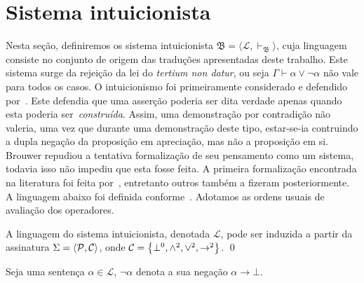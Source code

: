 \section{Sistema intuicionista}
    Nesta seção, definiremos os sistema intuicionista $\mathfrak{B}=\langle\mathcal{L},\vdash_\mathfrak{B}\rangle$, cuja linguagem consiste no conjunto de origem das traduções apresentadas deste trabalho.
    Este sistema surge da rejeição da lei do \textit{tertium non datur}, ou seja $\Gamma\vdash\alpha\vee\neg\alpha$ não vale para todos os casos.
    O intuicionismo foi primeiramente considerado e defendido por~\cite{Brouwer-A, Brouwer-B}.
    Este defendia que uma asserção poderia ser dita verdade apenas quando esta poderia ser~\emph{construída}.
    Assim, uma demonstração por contradição não valeria, uma vez que durante uma demonstração deste tipo, estar-se-ia contruindo a dupla negação da proposição em apreciação, mas não a proposição em si.
    Brouwer repudiou a tentativa formalização de seu pensamento como um sistema, todavia isso não impediu que esta fosse feita.
    A primeira formalização encontrada na literatura foi feita por~\cite{Kolmogorov}, entretanto outros também a fizeram posteriormente.
    A linguagem abaixo foi definida conforme~\cite{Troelstra}. Adotamos as ordens usuais de avaliação dos operadores.

    \vspace{\baselineskip}
    \begin{tcolorbox}[enhanced jigsaw, breakable, sharp corners, colframe=black, colback=white, boxrule=0.5pt, left=1.5mm, right=1.5mm, top=1.5mm, bottom=1.5mm]
    \begin{definition}[$\mathcal{L}$]\label{intuitionistic.language}
        A linguagem do sistema intuicionista, denotada $\mathcal{L}$, pode ser induzida a partir da assinatura $\Sigma=\langle\mathcal{P},\mathcal{C}\rangle$, onde $\mathcal{C}=\left\{\bot^0,\wedge^2,\vee^2,\to^2\right\}$.
        \qed{}
    \end{definition}
    \end{tcolorbox}

    \begin{tcolorbox}[enhanced jigsaw, breakable, sharp corners, colframe=black, colback=white, boxrule=0.5pt, left=1.5mm, right=1.5mm, top=1.5mm, bottom=1.5mm]
    \begin{notation}
        Seja uma sentença $\alpha\in\mathcal{L}$, $\neg\alpha$ denota a sua negação $\alpha\to\bot$.
    \end{notation}
    \end{tcolorbox}

